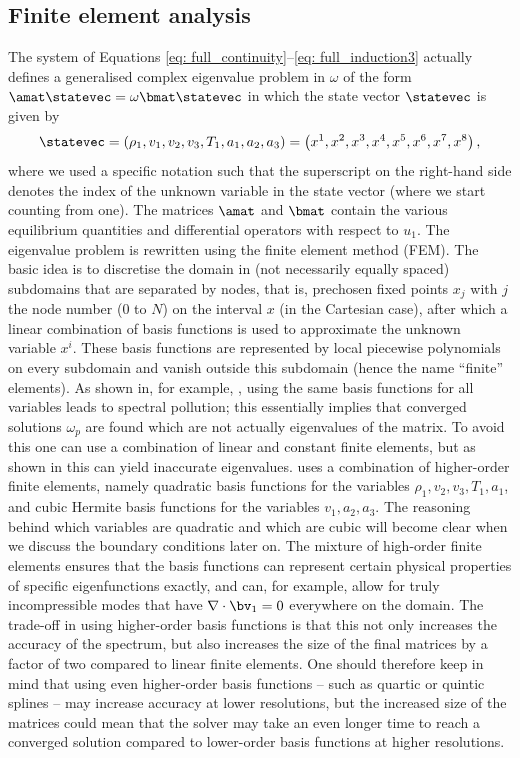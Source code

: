 \subsection{Finite element analysis} \label{ss: finite_elements}
The system of Equations \eqref{eq: full_continuity}--\eqref{eq: full_induction3} actually defines a generalised complex eigenvalue problem in $\omega$ of the form $\amat \statevec = \omega \bmat \statevec$ in which the state vector $\statevec$ is given by
\begin{equation} \label{eq: statevector}
  \statevec = \left(\rho_1, v_1, v_2, v_3, T_1, a_1, a_2, a_3\right)
   = \left(x^1, x^2, x^3, x^4, x^5, x^6, x^7, x^8\right),
\end{equation}
where we used a specific notation such that the superscript on the right-hand side denotes the index of the unknown variable in the state vector (where we start counting from one). The matrices $\amat$ and $\bmat$ contain the various equilibrium quantities and differential operators with respect to $u_1$. The eigenvalue problem is rewritten using the finite element method (\gls{FEM}). The basic idea is to discretise the domain in (not necessarily equally spaced) subdomains that are separated by nodes, that is, prechosen fixed points $x_j$ with $j$ the node number ($0$ to $N$) on the interval $x$ (in the Cartesian case), after which a linear combination of basis functions is used to approximate the unknown variable $x^i$. These basis functions are represented by local piecewise polynomials on every subdomain and vanish outside this subdomain (hence the name ``finite'' elements). As shown in, for example, \citet{rappaz1977}, using the same basis functions for all variables leads to spectral pollution; this essentially implies that converged solutions $\omega_p$ are found which are not actually eigenvalues of the matrix. To avoid this one can use a combination of linear and constant finite elements, but as shown in \citet{kerner1985} this can yield inaccurate eigenvalues.
{\legolas} uses a combination of higher-order finite elements, namely quadratic basis functions for the variables $\rho_1, v_2, v_3, T_1, a_1$, and cubic Hermite basis functions for the variables $v_1, a_2, a_3$. The reasoning behind which variables are quadratic and which are cubic will become clear when we discuss the boundary conditions later on. The mixture of high-order finite elements ensures that the basis functions can represent certain physical properties of specific eigenfunctions exactly, and can, for example, allow for truly incompressible modes that have $\nabla \cdot \bv_1 = 0$ everywhere on the domain. The trade-off in using higher-order basis functions is that this not only increases the accuracy of the spectrum, but also increases the size of the final matrices by a factor of two compared to linear finite elements. One should therefore keep in mind that using even higher-order basis functions -- such as quartic or quintic splines -- may increase accuracy at lower resolutions, but the increased size of the matrices could mean that the solver may take an even longer time to reach a converged solution compared to lower-order basis functions at higher resolutions.

